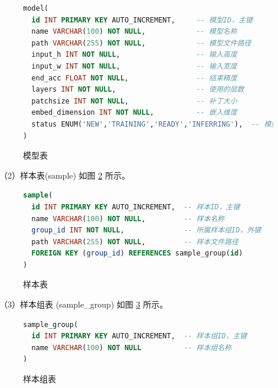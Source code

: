 \documentclass[
  ]{njuthesis}
\begin{document}
\begin{figure}[H]
    \centering
    \begin{minipage}{0.88\textwidth}
    {\linespread{1.2}
    \begin{lstlisting}[language=sql]
model(
  id INT PRIMARY KEY AUTO_INCREMENT,     -- 模型ID，主键
  name VARCHAR(100) NOT NULL,            -- 模型名称
  path VARCHAR(255) NOT NULL,            -- 模型文件路径
  input_h INT NOT NULL,                  -- 输入高度  
  input_w INT NOT NULL,                  -- 输入宽度
  end_acc FLOAT NOT NULL,                -- 结束精度
  layers INT NOT NULL,                   -- 使用的层数
  patchsize INT NOT NULL,                -- 补丁大小
  embed_dimension INT NOT NULL,          -- 嵌入维度
  status ENUM('NEW','TRAINING','READY','INFERRING'),  -- 模型状态
)
    \end{lstlisting}}
    \end{minipage}
    \caption{模型表}
    \label{模型表}
\end{figure}

（2）样本表(sample) 如图 \ref{样本表} 所示。

\begin{figure}[H]
    \centering
    \begin{minipage}{0.88\textwidth}
    {\linespread{1.2}
    \begin{lstlisting}[language=sql]
sample(
  id INT PRIMARY KEY AUTO_INCREMENT,  -- 样本ID，主键
  name VARCHAR(100) NOT NULL,         -- 样本名称
  group_id INT NOT NULL,              -- 所属样本组ID，外键
  path VARCHAR(255) NOT NULL,         -- 样本文件路径
  FOREIGN KEY (group_id) REFERENCES sample_group(id)
)
    \end{lstlisting}}
    \end{minipage}
    \caption{样本表}
    \label{样本表}
\end{figure}

（3）样本组表 (sample\_group) 如图 \ref{样本组表} 所示。

\begin{figure}[H]
    \centering
    \begin{minipage}{0.88\textwidth}
    {\linespread{1.2}
    \begin{lstlisting}[language=sql]
sample_group(
  id INT PRIMARY KEY AUTO_INCREMENT,  -- 样本组ID，主键
  name VARCHAR(100) NOT NULL          -- 样本组名称
)
    \end{lstlisting}}
    \end{minipage}
    \caption{样本组表}
    \label{样本组表}
\end{figure}
\end{document}
